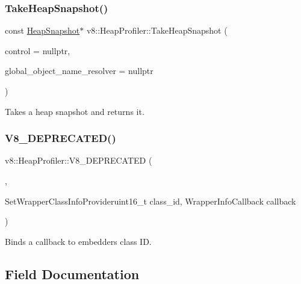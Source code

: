 \subsubsection{\texorpdfstring{Take\+Heap\+Snapshot()}{TakeHeapSnapshot()}}
{\footnotesize\ttfamily const \mbox{\hyperlink{classv8_1_1HeapSnapshot}{Heap\+Snapshot}}$\ast$ v8\+::\+Heap\+Profiler\+::\+Take\+Heap\+Snapshot (\begin{DoxyParamCaption}\item[{\mbox{\hyperlink{classv8_1_1ActivityControl}{Activity\+Control}} $\ast$}]{control = {\ttfamily nullptr},  }\item[{\mbox{\hyperlink{classv8_1_1HeapProfiler_1_1ObjectNameResolver}{Object\+Name\+Resolver}} $\ast$}]{global\+\_\+object\+\_\+name\+\_\+resolver = {\ttfamily nullptr} }\end{DoxyParamCaption})}

Takes a heap snapshot and returns it. \mbox{\label{classv8_1_1HeapProfiler_af41ccd8baea0da8d701e565b7b2e8eab}} 
\subsubsection{\texorpdfstring{V8\+\_\+\+D\+E\+P\+R\+E\+C\+A\+T\+E\+D()}{V8\_DEPRECATED()}}
{\footnotesize\ttfamily v8\+::\+Heap\+Profiler\+::\+V8\+\_\+\+D\+E\+P\+R\+E\+C\+A\+T\+ED (\begin{DoxyParamCaption}\item[{\char`\"{}Use Add\+Build\+Embedder\+Graph\+Callback to provide info about embedder nodes\char`\"{}}]{,  }\item[{void }]{Set\+Wrapper\+Class\+Info\+Provideruint16\+\_\+t class\+\_\+id, Wrapper\+Info\+Callback callback }\end{DoxyParamCaption})}

Binds a callback to embedder\textquotesingle{}s class ID. 

\subsection{Field Documentation}
\mbox{\label{classv8_1_1HeapProfiler_a272c9af3ea5cd90a2737af3d22a7eb78}} 
